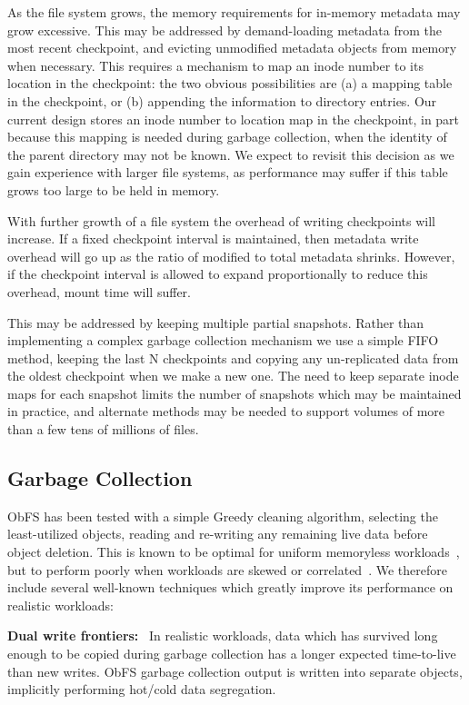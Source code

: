 \documentclass[sigconf,anonymous,10pt]{acmart}
\begin{document}
\begin{CCSXML}
As the file system grows, the memory requirements for in-memory metadata may grow excessive.
This may be addressed by demand-loading metadata from the most recent checkpoint, and evicting unmodified metadata objects from memory when necessary.
This requires a mechanism to map an inode number to its location in the checkpoint: the two obvious possibilities are (a) a mapping table in the checkpoint, or (b) appending the information to directory entries.
Our current design stores an inode number to location map in the checkpoint, in part because this mapping is needed during garbage collection, when the identity of the parent directory may not be known.
We expect to revisit this decision as we gain experience with larger file systems, as performance may suffer if this table grows too large to be held in memory.

With further growth of a file system the overhead of writing checkpoints will increase.
If a fixed checkpoint interval is maintained, then metadata write overhead will go up as the ratio of modified to total metadata shrinks.
However, if the checkpoint interval is allowed to expand proportionally to reduce this overhead, mount time will suffer.

This may be addressed by keeping multiple partial snapshots.
Rather than implementing a complex garbage collection mechanism we use a simple FIFO method, keeping the last N checkpoints and copying any un-replicated data from the oldest checkpoint when we make a new one.
The need to keep separate inode maps for each snapshot limits the number of snapshots which may be maintained in practice, and alternate methods may be needed to support volumes of more than a few tens of millions of files.

\subsection{Garbage Collection}

ObFS has been tested with a simple Greedy cleaning algorithm, selecting the least-utilized objects, reading and re-writing any remaining live data before object deletion.
This is known to be optimal for uniform memoryless workloads~\cite{yang_optimality_2015}, but to perform poorly when workloads are skewed or correlated~\cite{desnoyers_analytic_2014}. 
We therefore include several well-known techniques which greatly improve its performance on realistic workloads:

\textbf{Dual write frontiers:}~\cite{lin_dual_2012} In realistic workloads, data which has survived long enough to be copied during garbage collection has a longer expected time-to-live than new writes.
  ObFS garbage collection output is written into separate objects, implicitly performing hot/cold data segregation.


\end{CCSXML}
\end{document}

